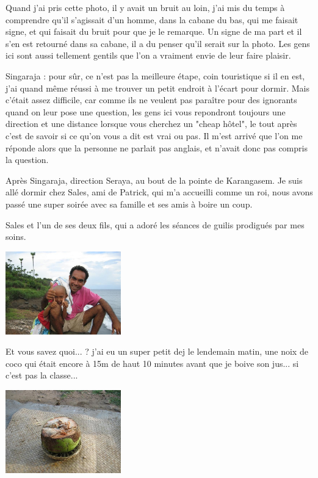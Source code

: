 \begin{multicols}{2}
Quand j'ai pris cette photo, il y avait un bruit au loin, j'ai mis du temps à comprendre qu'il s'agissait d'un homme, dans la cabane du bas, qui me faisait signe, et qui faisait du bruit pour que je le remarque. Un signe de ma part et il s'en est retourné dans sa cabane, il a du penser qu'il serait sur la photo. Les gens ici sont aussi tellement gentils que l'on a vraiment envie de leur faire plaisir.

Singaraja : pour sûr, ce n'est pas la meilleure étape, coin touristique si il en est, j'ai quand même réussi à me trouver un petit endroit à l'écart pour dormir. Mais c'était assez difficile, car comme ils ne veulent pas paraître pour des ignorants quand on leur pose une question, les gens ici vous repondront toujours une direction et une distance lorsque vous cherchez un "cheap hôtel", le tout après c'est de savoir si ce qu'on vous a dit est vrai ou pas. Il m'est arrivé que l'on me réponde alors que la personne ne parlait pas anglais, et n'avait donc pas compris la question.

Après Singaraja, direction Seraya, au bout de la pointe de Karangasem. Je suis allé dormir chez Sales, ami de Patrick, qui m'a accueilli comme un roi, nous avons passé une super soirée avec sa famille et ses amis à boire un coup.

Sales et l'un de ses deux fils, qui a adoré les séances de guilis prodigués par mes soins.

\smallbreak
\hspace*{-0.65cm}
\includegraphics[width=5cm]{articles/Round-trip-in-bali/1208257303gr5r.jpg}
\smallbreak

Et vous savez quoi... ? j'ai eu un super petit dej le lendemain matin, une noix de coco qui était encore à 15m de haut 10 minutes avant que je boive son jus... si c'est pas la classe...

\smallbreak
\hspace*{-0.65cm}
\includegraphics[width=5cm]{articles/Round-trip-in-bali/1208257299a93l.jpg}
\smallbreak


\end{multicols}
